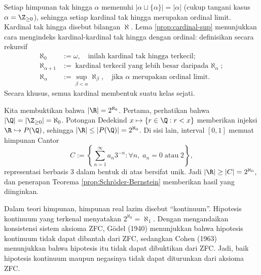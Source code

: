 Setiap himpunan tak hingga $\alpha$ memenuhi $|\alpha \sqcup \{\alpha\}| = |\alpha|$ (cukup tangani kasus $\alpha=\Z_{\geq 0}$), sehingga setiap kardinal tak hingga merupakan ordinal limit. Kardinal tak hingga disebut bilangan $\aleph$. Lema \ref{prop:cardinal-sup} menunjukkan cara mengindeks kardinal-kardinal tak hingga dengan ordinal: definisikan secara rekursif
\begin{align*}
	\aleph_0 & := \omega, \quad \text{inilah kardinal tak hingga terkecil}; \\
	\aleph_{\alpha+1} & := \text{kardinal terkecil yang lebih besar daripada $\aleph_\alpha$}; \\
	\aleph_\alpha & := \sup_{\beta < \alpha} \aleph_\beta, \quad \text{jika $\alpha$ merupakan ordinal limit}.
\end{align*}
Secara khusus, semua kardinal membentuk suatu kelas sejati.

\begin{example}[Cantor]\label{eg:continuum}
	Kita membuktikan bahwa $|\R| = 2^{\aleph_0}$. Pertama, perhatikan bahwa $|\Q|=|\Z_{\geq 0}|=\aleph_0$. Potongan Dedekind $x \mapsto \{r \in \Q: r < x \}$ memberikan injeksi $\R \hookrightarrow P(\Q)$, sehingga $|\R| \leq |P(\Q)|=2^{\aleph_0}$. Di sisi lain, interval $[0,1]$ memuat himpunan Cantor
	\[ C := \left\{ \sum_{n=1}^\infty a_n 3^{-n}: \forall n, \; a_n = 0 \;\text{atau}\; 2  \right\}, \]
	representasi berbasis $3$ dalam bentuk di atas bersifat unik. Jadi $|\R| \geq |C| = 2^{\aleph_0}$, dan penerapan Teorema \ref{prop:Schröder-Bernstein} memberikan hasil yang diinginkan.
\end{example}

Dalam teori himpunan, himpunan real lazim disebut ``kontinuum''. Hipotesis kontinuum yang terkenal menyatakan $2^{\aleph_0} = \aleph_1$. Dengan mengandaikan konsistensi sistem aksioma ZFC, Gödel (1940) menunjukkan bahwa hipotesis kontinuum tidak dapat dibantah dari ZFC, sedangkan Cohen (1963) menunjukkan bahwa hipotesis itu tidak dapat dibuktikan dari ZFC. Jadi, baik hipotesis kontinuum maupun negasinya tidak dapat diturunkan dari aksioma ZFC.

